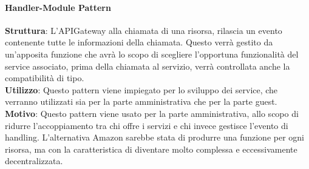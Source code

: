 \documentclass[../DefinizioneDiProdotto_v3.0.0.tex]{subfiles}
\begin{document}
\paragraph{Handler-Module Pattern}\mbox{}
\begin{addmargin}[1em]{2em}%
	\textbf{Struttura}:	L'APIGateway alla chiamata di una risorsa, rilascia un evento contenente tutte le informazioni della chiamata. Questo verrà gestito da un'apposita funzione che avrà lo scopo di scegliere l'opportuna funzionalità del service associato, prima della chiamata al servizio, verrà controllata anche la compatibilità di tipo.\\
	\textbf{Utilizzo}:  Questo pattern viene impiegato per lo sviluppo dei service, che verranno utilizzati sia per la parte amministrativa che per la parte guest.\\
	\textbf{Motivo}: Questo pattern viene usato per la parte amministrativa, allo scopo di ridurre l'accoppiamento tra chi offre i servizi e chi invece gestisce l'evento di handling. L'alternativa Amazon sarebbe stata di produrre una funzione per ogni risorsa, ma con la caratteristica di diventare molto complessa e eccessivamente decentralizzata.
\end{addmargin}
\end{document}
